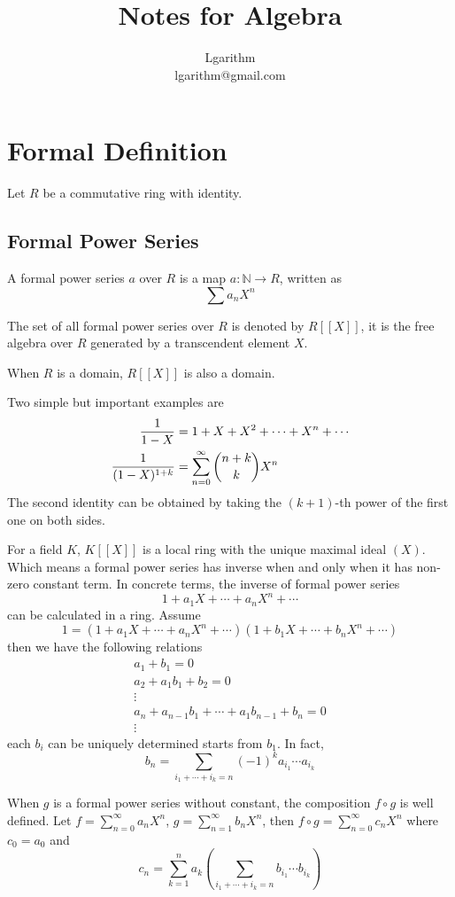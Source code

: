 \documentclass{article}
\title{Notes for Algebra}
\author{Lgarithm\\\mbox{lgarithm@gmail.com}}
\begin{document}
\maketitle
\newpage
\tableofcontents
\newpage


\section{Formal Definition}
Let $R$ be a commutative ring with identity.

\subsection{Formal Power Series}
A formal power series $a$ over $R$ is a map $a : \mathbb N \to R$,
written as $$\sum a_n X^n$$

The set of all formal power series over $R$ is denoted by $R[[X]]$,
it is the free algebra over $R$ generated by a transcendent element $X$.

When $R$ is a domain, $R[[X]]$ is also a domain.

Two simple but important examples are
\begin{align*}
  {1 \over 1 - X} &= 1 + X + X^2 + \cdots + X^n + \cdots \\
  {1 \over (1 - X)^{1 + k}} &= \sum_{n = 0}^\infty {n + k \choose k} X^n
\end{align*}
The second identity can be obtained by taking the $(k + 1)$-th power of the first one on both sides.

For a field $K$, $K[[X]]$ is a local ring with the unique maximal ideal $(X)$.
Which means a formal power series has inverse when and only when it has non-zero constant term.
In concrete terms, the inverse of formal power series
$$1 + a_1 X + \cdots + a_n X^n + \cdots$$
can be calculated in a ring. Assume
$$1 = (1 + a_1 X + \cdots + a_n X^n + \cdots) (1 + b_1 X + \cdots + b_n X^n + \cdots)$$
then we have the following relations
\begin{align*}
    a_1 + b_1 = 0 \\
    a_2 + a_1b_1 + b_2 = 0 \\
    \vdots \\
    a_n + a_{n-1}b_1 + \cdots + a_1b_{n-1} + b_n = 0 \\
    \vdots
\end{align*}
each $b_i$ can be uniquely determined starts from $b_1$. In fact,
$$b_n = \sum_{i_1 + \cdots + i_k = n} (-1)^k a_{i_1} \cdots a_{i_k}$$

When $g$ is a formal power series without constant, the composition $f \circ g$ is well defined. Let $f = \sum_{n=0}^\infty a_n X^n$, $g = \sum_{n=1}^\infty b_n X^n$, then $f \circ g = \sum_{n=0}^\infty c_n X^n$ where $c_0 = a_0$ and
$$c_n = \sum_{k=1}^n a_k
(\sum_{i_1 + \cdots + i_k = n} b_{i_1} \cdots b_{i_k})$$
\end{document}
